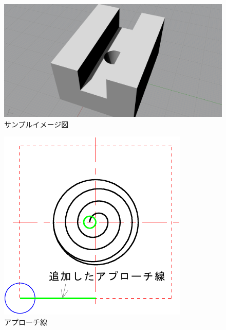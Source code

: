 \begin{minipage}{0.5\textwidth}
\begin{figure}[H]
\centering
\includegraphics[width=\textwidth]{No3/fig/approach-img.png}
\caption{サンプルイメージ図}
\label{fig:approach-img.png}
\end{figure}
\end{minipage}
\begin{minipage}{0.5\textwidth}
\begin{figure}[H]
\centering
\includegraphics{No3/fig/approach-crop.pdf}
\caption{アプローチ線}
\label{fig:approach.pdf}
\end{figure}
\end{minipage}


